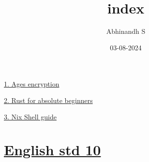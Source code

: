 \documentclass[11pt]{article}
\author{Abhinandh S}
\date{03-08-2024}
\title{index}
\begin{document}
\maketitle
\tableofcontents

\href{articles/ages.org}{1. Ages encryption}

\href{articles/rust.org}{2. Rust for absolute beginners}

\href{articles/nix-shell.org}{3. Nix Shell guide}

\section{\href{./notes/ten/english/chapter\_1.org}{English std 10}}
\label{sec:orgc2e76d8}
\end{document}
